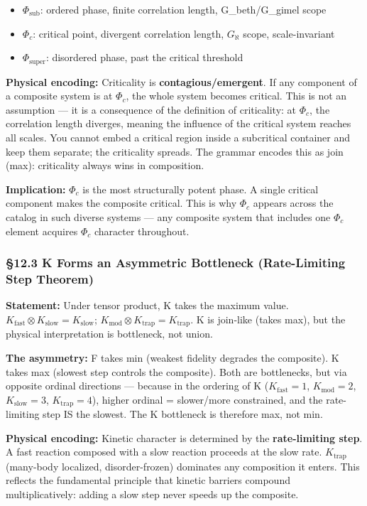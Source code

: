 \documentclass[12pt,a4paper]{article}
\newcommand{\pilcrow}{\S}
\begin{document}
\begin{itemize}
    \item $\Phi_{\text{sub}}$: ordered phase, finite correlation length, G\_beth/G\_gimel scope
    \item $\Phi_c$: critical point, divergent correlation length, $G_{\aleph}$ scope, scale-invariant
    \item $\Phi_{\text{super}}$: disordered phase, past the critical threshold
\end{itemize}

\textbf{Physical encoding:} Criticality is \textbf{contagious/emergent}. If any component of a composite system is at $\Phi_c$, the whole system becomes critical. This is not an assumption --- it is a consequence of the definition of criticality: at $\Phi_c$, the correlation length diverges, meaning the influence of the critical system reaches all scales. You cannot embed a critical region inside a subcritical container and keep them separate; the criticality spreads. The grammar encodes this as join (max): criticality always wins in composition.

\textbf{Implication:} $\Phi_c$ is the most structurally potent phase. A single critical component makes the composite critical. This is why $\Phi_c$ appears across the catalog in such diverse systems --- any composite system that includes one $\Phi_c$ element acquires $\Phi_c$ character throughout.

\subsubsection{\pilcrow{}12.3 K Forms an Asymmetric Bottleneck (Rate-Limiting Step Theorem)}

\textbf{Statement:} Under tensor product, K takes the maximum value. $K_{\text{fast}} \otimes K_{\text{slow}} = K_{\text{slow}}$; $K_{\text{mod}} \otimes K_{\text{trap}} = K_{\text{trap}}$. K is join-like (takes max), but the physical interpretation is bottleneck, not union.

\textbf{The asymmetry:} F takes min (weakest fidelity degrades the composite). K takes max (slowest step controls the composite). Both are bottlenecks, but via opposite ordinal directions --- because in the ordering of K ($K_{\text{fast}}=1$, $K_{\text{mod}}=2$, $K_{\text{slow}}=3$, $K_{\text{trap}}=4$), higher ordinal = slower/more constrained, and the rate-limiting step IS the slowest. The K bottleneck is therefore max, not min.

\textbf{Physical encoding:} Kinetic character is determined by the \textbf{rate-limiting step}. A fast reaction composed with a slow reaction proceeds at the slow rate. $K_{\text{trap}}$ (many-body localized, disorder-frozen) dominates any composition it enters. This reflects the fundamental principle that kinetic barriers compound multiplicatively: adding a slow step never speeds up the composite.
\end{document}
